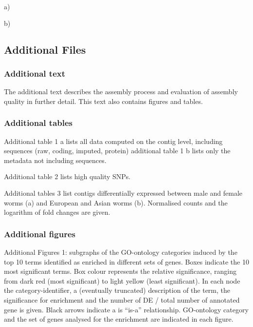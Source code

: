 \documentclass[10pt]{bmc_article}
\newenvironment{bmcformat}{\begin{raggedright}\baselineskip20pt\sloppy\setboolean{publ}{false}}{\end{raggedright}\baselineskip20pt\sloppy}
\begin{document}
\begin{bmcformat}
a)\\


\newpage

b)\\


\normalsize


\subsection*{Additional Files}

\subsubsection*{Additional text}
The additional text describes the assembly process and evaluation of
assembly quality in further detail. This text also contains figures
and tables.

\subsubsection*{Additional tables}

Additional table 1 a lists all data computed on the contig level,
including sequences (raw, coding, imputed, protein) additional table 1
b lists only the metadata not including sequences.

Additional table 2 lists high quality SNPs.

Additional tables 3 list contigs differentially expressed between male
and female worms (a) and European and Asian worms (b). Normalised
counts and the logarithm of fold changes are given.


\subsubsection*{Additional figures}
Additional Figures 1: subgraphs of the GO-ontology categories induced
by the top 10 terms identified as enriched in different sets of
genes. Boxes indicate the 10 most significant terms. Box colour
represents the relative significance, ranging from dark red (most
significant) to light yellow (least significant). In each node the
category-identifier, a (eventually truncated) description of the term,
the significance for enrichment and the number of DE / total number of
annotated gene is given. Black arrows indicate a is ``is-a''
relationship. GO-ontology category and the set of genes analysed for
the enrichment are indicated in each figure.

\end{bmcformat}
\end{document}
